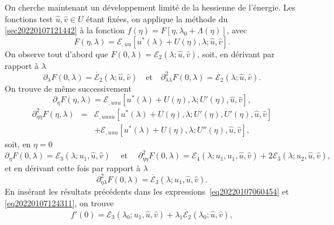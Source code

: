 \documentclass{article}
\newcommand{\nocomma}{}
\newcommand{\tmop}[1]{\ensuremath{\operatorname{#1}}}
\begin{document}
On cherche maintenant un d{\'e}veloppement limit{\'e} de la hessienne de
l'{\'e}nergie. Les fonctions test $\hat{u}, \hat{v} \in U$ {\'e}tant
fix{\'e}es, on applique la m{\'e}thode du
{\textsection}\ref{sec20220107121442} {\`a} la fonction $f (\eta) = F [\eta,
\lambda_0 + \Lambda (\eta)]$, avec
\begin{equation}
  F (\eta, \lambda) =\mathcal{E}_{, u \nocomma u} [u^{\ast} (\lambda) + U
  (\eta), \lambda ; \hat{u}, \hat{v}] .
\end{equation}
On observe tout d'abord que $F (0, \lambda) =\mathcal{E}_2 (\lambda ; \hat{u},
\hat{v})$, soit, en d{\'e}rivant par rapport {\`a} $\lambda$
\begin{equation}
  \partial_{\lambda} F (0, \lambda) = \dot{\mathcal{E}_2} (\lambda ; \hat{u},
  \hat{v}) \quad \text{et} \quad \partial_{\lambda \nocomma \lambda}^2 F (0,
  \lambda) = \ddot{\mathcal{E}_2} (\lambda ; \hat{u}, \hat{v}) .
\end{equation}
On trouve de m{\^e}me successivement
\begin{equation}
  \partial_{\eta} F (\eta, \lambda) =\mathcal{E}_{, u \nocomma u \nocomma u}
  [u^{\ast} (\lambda) + U (\eta), \lambda ; U' (\eta), \hat{u}, \hat{v}],
\end{equation}
\begin{eqnarray}
  \partial_{\eta \nocomma \eta}^2 F (\eta, \lambda) & = & \mathcal{E}_{, u
  \nocomma u \nocomma u \nocomma u} [u^{\ast} (\lambda) + U (\eta), \lambda ;
  U' (\eta), U' (\eta), \hat{u}, \hat{v}] \nonumber\\
  &  & +\mathcal{E}_{, u \nocomma u \nocomma u} [u^{\ast} (\lambda) + U
  (\eta), \lambda ; U'' (\eta), \hat{u}, \hat{v}],
\end{eqnarray}
soit, en $\eta = 0$
\begin{equation}
  \partial_{\eta} F (0, \lambda) =\mathcal{E}_3 (\lambda ; u_1, \hat{u},
  \hat{v}) \quad \tmop{et} \quad \partial_{\eta \nocomma \eta}^2 F (0,
  \lambda) =\mathcal{E}_4 (\lambda ; u_1, u_1, \hat{u}, \hat{v}) +
  2\mathcal{E}_3 (\lambda ; u_2, \hat{u}, \hat{v}),
\end{equation}
et en d{\'e}rivant cette fois par rapport {\`a} $\lambda$
\begin{equation}
  \partial_{\eta \nocomma \lambda}^2 F (0, \lambda) = \dot{\mathcal{E}_3}
  (\lambda ; u_1, \hat{u}, \hat{v}) .
\end{equation}
En ins{\'e}rant les r{\'e}sultats pr{\'e}c{\'e}dents dans les
expressions~\eqref{eq20220107060454} et \eqref{eq20220107124311}, on trouve
\begin{equation}
  f' (0) =\mathcal{E}_3 (\lambda_0 ; u_1, \hat{u}, \hat{v}) + \lambda_1
  \dot{\mathcal{E}_2} (\lambda_0 ; \hat{u}, \hat{v}),
\end{equation}
\end{document}
